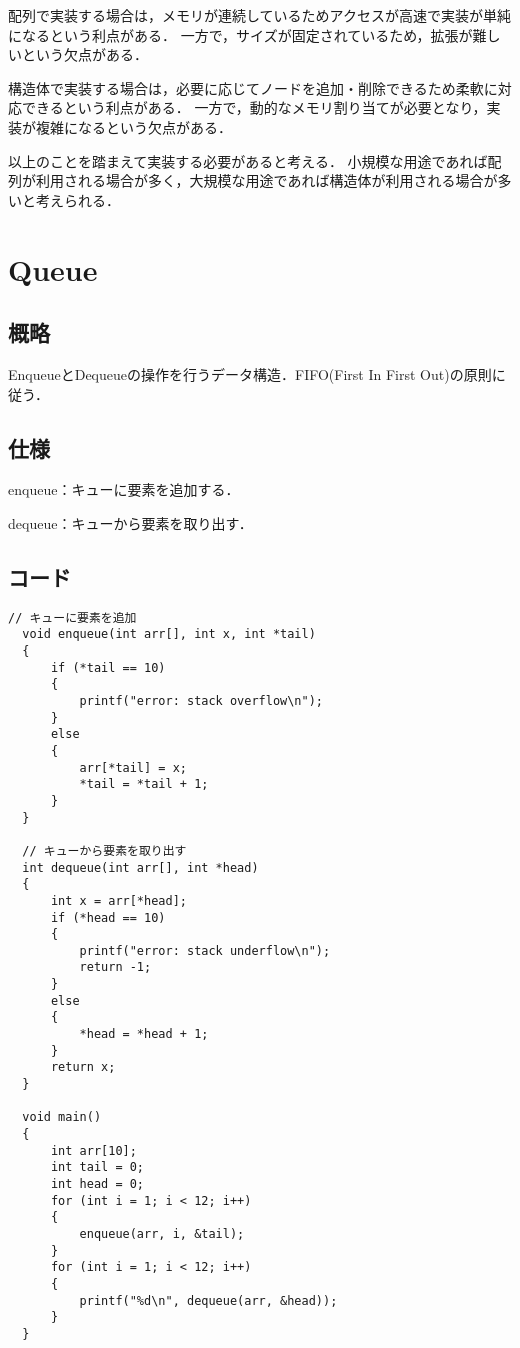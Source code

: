 \documentclass{ltjsarticle}
\begin{document}
配列で実装する場合は，メモリが連続しているためアクセスが高速で実装が単純になるという利点がある．
一方で，サイズが固定されているため，拡張が難しいという欠点がある．

構造体で実装する場合は，必要に応じてノードを追加・削除できるため柔軟に対応できるという利点がある．
一方で，動的なメモリ割り当てが必要となり，実装が複雑になるという欠点がある．

以上のことを踏まえて実装する必要があると考える．
小規模な用途であれば配列が利用される場合が多く，大規模な用途であれば構造体が利用される場合が多いと考えられる．

\section{Queue}
\subsection{概略}
EnqueueとDequeueの操作を行うデータ構造．FIFO(First In First Out)の原則に従う．

\subsection{仕様}
\noindent enqueue：キューに要素を追加する．

\noindent dequeue：キューから要素を取り出す．

\subsection{コード}
\begin{lstlisting}[frame=single, lineskip=-5pt]
  // キューに要素を追加
  void enqueue(int arr[], int x, int *tail)
  {
      if (*tail == 10)
      {
          printf("error: stack overflow\n");
      }
      else
      {
          arr[*tail] = x;
          *tail = *tail + 1;
      }
  }
  
  // キューから要素を取り出す
  int dequeue(int arr[], int *head)
  {
      int x = arr[*head];
      if (*head == 10)
      {
          printf("error: stack underflow\n");
          return -1;
      }
      else
      {
          *head = *head + 1;
      }
      return x;
  }
  
  void main()
  {
      int arr[10];
      int tail = 0;
      int head = 0;
      for (int i = 1; i < 12; i++)
      {
          enqueue(arr, i, &tail);
      }
      for (int i = 1; i < 12; i++)
      {
          printf("%d\n", dequeue(arr, &head));
      }
  }
\end{lstlisting}
\end{document}
